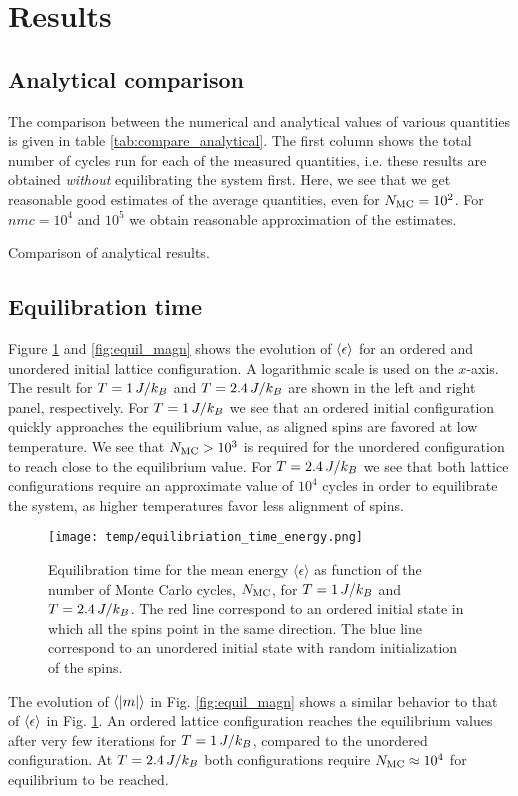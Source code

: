 \section{Results}\label{sec:results}
\subsection{Analytical comparison}\label{subsec_results:analytical}
The comparison between the numerical and analytical values of various quantities is given in table \ref{tab:compare_analytical}. The first column shows the total number of cycles run for each of the measured quantities, i.e. these results are obtained \textit{without} equilibrating the system first. Here, we see that we get reasonable good estimates of the average quantities, even for $N_\mathrm{MC}=10^2$. For $nmc=10^4$ and $10^5$ we obtain reasonable approximation of the estimates.  

\begin{table}[!ht]
    
    \caption{Comparison of analytical results. }
    \label{tab:compare_analytical}
\end{table}


\subsection{Equilibration time}\label{subsec_results:equilibriation_time}
Figure \ref{fig:equil_energy} and \ref{fig:equil_magn} shows the evolution of $\expval{\epsilon}$ for an ordered and unordered initial lattice configuration. A logarithmic scale is used on the $x$-axis. The result for $T=1\,J/k_B$ and $T=2.4\,J/k_B$ are shown in the left and right panel, respectively. For $T=1\,J/k_B$ we see that an ordered initial configuration quickly approaches the equilibrium value, as aligned spins are favored at low temperature. We see that $N_\mathrm{MC}>10^3$ is required for the unordered configuration to reach close to the equilibrium value. For $T=2.4\,J/k_B$ we see that both lattice configurations require an approximate value of $10^4$ cycles in order to equilibrate the system, as higher temperatures favor less alignment of spins.    
\begin{figure}[!ht]
    \texttt{[image: temp/equilibriation\_time\_energy.png]}
    \caption{Equilibration time for the mean energy $\langle \epsilon \rangle $ as function of the number of Monte Carlo cycles, $N_\mathrm{MC}$, for $T=1\,J/k_B$ and $T=2.4\,J/k_B$. The red line correspond to an ordered initial state in which all the spins point in the same direction. The blue line correspond to an unordered initial state with random initialization of the spins.}

    \label{fig:equil_energy}
\end{figure}
The evolution of $\expval{\abs{m}}$ in Fig. \ref{fig:equil_magn} shows a similar behavior to that of $\expval{\epsilon}$ in Fig. \ref{fig:equil_energy}. An ordered lattice configuration reaches the equilibrium values after very few iterations for $T=1\,J/k_B$, compared to the unordered configuration. At $T=2.4\,J/k_B$ both configurations require $N_\mathrm{MC}\approx10^4$ for equilibrium to be reached. 

